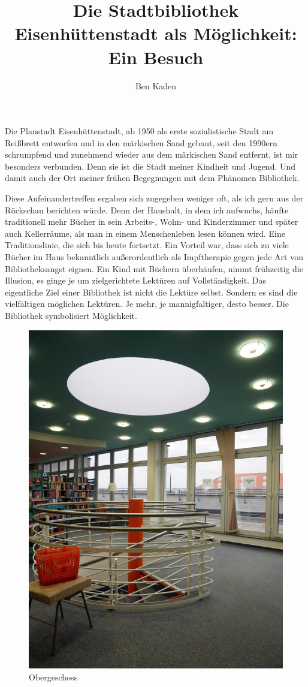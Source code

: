 \documentclass[a4paper,
fontsize=11pt,
oneside,
numbers=noperiodatend,
parskip=half-,
bibliography=totoc,
final
]{scrartcl}
\title{\LARGE{Die Stadtbibliothek Eisenhüttenstadt als Möglichkeit: Ein Besuch}} %
\author{Ben Kaden} %
\date{}
\begin{document}
\maketitle
\thispagestyle{fancyplain} 


Die Planstadt Eisenhüttenstadt, ab 1950 als erste sozialistische Stadt
am Reißbrett entworfen und in den märkischen Sand gebaut, seit den
1990ern schrumpfend und zunehmend wieder aus dem märkischen Sand
entfernt, ist mir besonders verbunden. Denn sie ist die Stadt meiner
Kindheit und Jugend. Und damit auch der Ort meiner frühen Begegnungen
mit dem Phänomen Bibliothek.

Diese Aufeinandertreffen ergaben sich zugegeben weniger oft, als ich
gern aus der Rückschau berichten würde. Denn der Haushalt, in dem ich
aufwuchs, häufte traditionell mehr Bücher in sein Arbeits-, Wohn- und
Kinderzimmer und später auch Kellerräume, als man in einem Menschenleben
lesen können wird. Eine Traditionslinie, die sich bis heute fortsetzt.
Ein Vorteil war, dass sich zu viele Bücher im Haus bekanntlich
außerordentlich als Impftherapie gegen jede Art von Bibliotheksangst
eignen. Ein Kind mit Büchern überhäufen, nimmt frühzeitig die Illusion,
es ginge je um zielgerichtete Lektüren auf Vollständigkeit. Das
eigentliche Ziel einer Bibliothek ist nicht die Lektüre selbst. Sondern
es sind die vielfältigen möglichen Lektüren. Je mehr, je mannigfaltiger,
desto besser. Die Bibliothek symbolisiert Möglichkeit.

\begin{figure}
\centering
\includegraphics{img/image_1.jpg}
\caption{Obergeschoss}
\end{figure}
\end{document}
